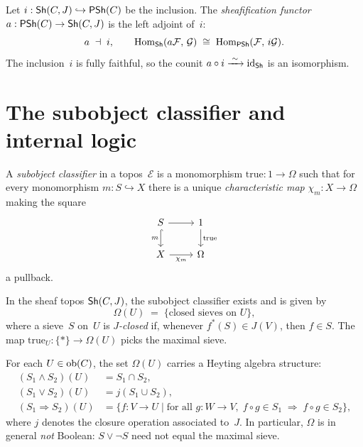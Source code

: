 \begin{definition}
\label{def:sheafification}
Let $i : \mathsf{Sh}(C,J) \hookrightarrow \mathsf{PSh}(C)$ be the inclusion.  The
\emph{sheafification functor} $a : \mathsf{PSh}(C) \to \mathsf{Sh}(C,J)$ is the left
adjoint of~$i$:
\[
  a \;\dashv\; i,
  \qquad
  \mathrm{Hom}_{\mathsf{Sh}}(a\mathcal{F},\, \mathcal{G})
  \;\cong\;
  \mathrm{Hom}_{\mathsf{PSh}}(\mathcal{F},\, i\mathcal{G}).
\]
The inclusion~$i$ is fully faithful, so the counit
$a \circ i \xrightarrow{\;\sim\;} \mathrm{id}_{\mathsf{Sh}}$ is an isomorphism.
\end{definition}

\section{The subobject classifier and internal logic}
\label{sec:omega}

\begin{definition}
\label{def:subobj}
A \emph{subobject classifier} in a topos~$\mathcal{E}$ is a monomorphism
$\mathrm{true} : 1 \to \Omega$ such that for every monomorphism
$m : S \hookrightarrow X$ there is a unique \emph{characteristic map}
$\chi_m : X \to \Omega$ making the square
\[
\begin{tikzcd}
  S \arrow[r] \arrow[d, hook, "m"'] & 1 \arrow[d, "\mathrm{true}"] \\
  X \arrow[r, "\chi_m"'] & \Omega
\end{tikzcd}
\]
a pullback.
\end{definition}

\begin{theorem}
\label{thm:omega-exists}
In the sheaf topos $\mathsf{Sh}(C,J)$, the subobject classifier exists and is
given by
\[
  \Omega(U) \;=\; \{\text{closed sieves on } U\},
\]
where a sieve~$S$ on~$U$ is \emph{$J$-closed} if, whenever
$f^*(S) \in J(V)$, then $f \in S$.  The map
$\mathrm{true}_U : \{*\} \to \Omega(U)$ picks the maximal sieve.
\end{theorem}

\begin{proposition}
\label{prop:heyting}
For each $U \in \mathrm{ob}(C)$, the set $\Omega(U)$ carries a Heyting algebra
structure:
\begin{align*}
  (S_1 \wedge S_2)(U) &= S_1 \cap S_2, \\
  (S_1 \vee S_2)(U) &= j(S_1 \cup S_2), \\
  (S_1 \Rightarrow S_2)(U) &= \{f : V \to U \mid
    \text{for all } g : W \to V,\;
    f \circ g \in S_1 \;\Longrightarrow\;
    f \circ g \in S_2 \},
\end{align*}
where $j$ denotes the closure operation associated to~$J$.  In
particular, $\Omega$ is in general \emph{not} Boolean:
$S \vee \neg S$ need not equal the maximal sieve.
\end{proposition}

